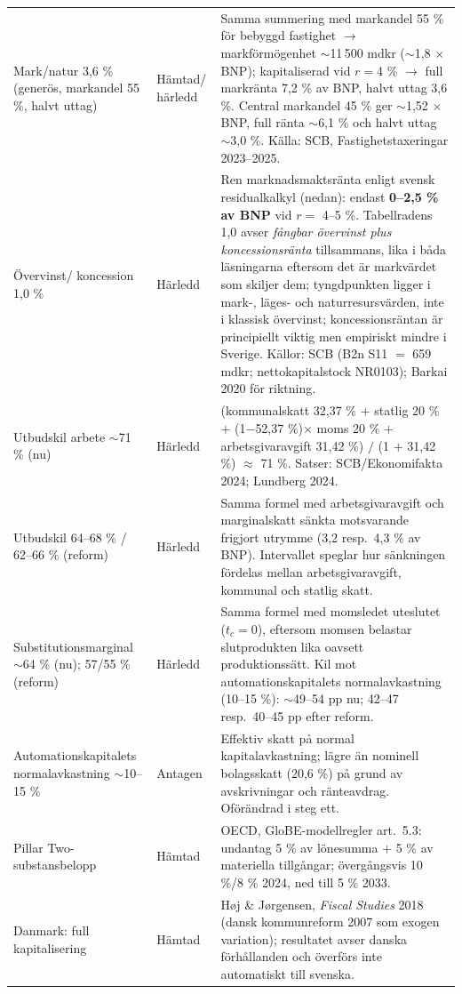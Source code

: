 \documentclass[11pt]{article}
\begin{document}
{\begin{longtable}{@{}p{2.7cm}p{1.8cm}p{9.6cm}@{}}
Mark/natur 3,6 \% (generös, markandel 55 \%, halvt uttag) & Hämtad/ härledd & Samma summering med markandel 55 \% för bebyggd fastighet $\to$ markförmögenhet $\sim$11\,500 mdkr ($\sim$1,8 $\times$ BNP); kapitaliserad vid $r=$4 \% $\to$ full markränta 7,2 \% av BNP, halvt uttag 3,6 \%. Central markandel 45 \% ger $\sim$1,52 $\times$ BNP, full ränta $\sim$6,1 \% och halvt uttag $\sim$3,0 \%. Källa: SCB, Fastighetstaxeringar 2023--2025. \\
Övervinst/ koncession 1,0 \% & Härledd & Ren marknadsmaktsränta enligt svensk residualkalkyl (nedan): endast \textbf{0--2,5 \% av BNP} vid $r =$ 4--5 \%. Tabellradens 1,0 avser \emph{fångbar övervinst plus koncessionsränta} tillsammans, lika i båda läsningarna eftersom det är markvärdet som skiljer dem; tyngdpunkten ligger i mark-, läges- och naturresursvärden, inte i klassisk övervinst; koncessionsräntan är principiellt viktig men empiriskt mindre i Sverige. Källor: SCB (B2n S11 $=$ 659 mdkr; nettokapitalstock NR0103); Barkai 2020 för riktning. \\
Utbudskil arbete $\sim$71 \% (nu) & Härledd & (kommunalskatt 32,37 \% $+$ statlig 20 \% $+$ (1$-$52,37 \%)$\times$ moms 20 \% $+$ arbetsgivaravgift 31,42 \%) $/$ (1 $+$ 31,42 \%) $\approx$ 71 \%. Satser: SCB/Ekonomifakta 2024; Lundberg 2024. \\
Utbudskil 64--68 \% / 62--66 \% (reform) & Härledd & Samma formel med arbetsgivaravgift och marginalskatt sänkta motsvarande frigjort utrymme (3,2 resp.\ 4,3 \% av BNP). Intervallet speglar hur sänkningen fördelas mellan arbetsgivaravgift, kommunal och statlig skatt. \\
Substitutions\-marginal $\sim$64 \% (nu); 57/55 \% (reform) & Härledd & Samma formel med momsledet uteslutet ($t_c=0$), eftersom momsen belastar slutprodukten lika oavsett produktionssätt. Kil mot automationskapitalets normalavkastning (10--15 \%): $\sim$49--54 pp nu; 42--47 resp.\ 40--45 pp efter reform. \\
Automations\-kapitalets normalavkastning $\sim$10--15 \% & Antagen & Effektiv skatt på normal kapitalavkastning; lägre än nominell bolagsskatt (20,6 \%) på grund av avskrivningar och ränteavdrag. Oförändrad i steg ett. \\
Pillar Two-substansbelopp & Hämtad & OECD, GloBE-modellregler art.\ 5.3: undantag 5 \% av lönesumma $+$ 5 \% av materiella tillgångar; övergångsvis 10 \%/8 \% 2024, ned till 5 \% 2033. \\
Danmark: full kapitalisering & Hämtad & Høj \& Jørgensen, \textit{Fiscal Studies} 2018 (dansk kommunreform 2007 som exogen variation); resultatet avser danska förhållanden och överförs inte automatiskt till svenska. \\
\end{longtable}
}
\end{document}
